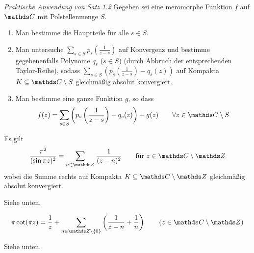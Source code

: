\noindent\emph{Praktische Anwendung von Satz 1.2} Gegeben sei eine meromorphe Funktion $f$ auf $\CC$ mit Polstellenmenge $S$.
\begin{enumerate}
\item Man bestimme die Hauptteile für alle $s\in S$.
\item Man untersuche $\sum _{s\in S} p_s(\frac{1}{z-s})$ auf Konvergenz und bestimme gegebenenfalls Polynome $q_s$ ($s\in S$) (durch Abbruch der entsprechenden Taylor-Reihe), sodass $\sum _{s\in S} (p_s(\frac{1}{z-s})-q_s(z))$ auf Kompakta $K \subseteq \CC\setminus S$ gleichmäßig absolut konvergiert.
\item Man bestimme eine ganze Funktion $g$, so dass
\[
	f(z) = \sum_{s\in S} \left(p_s\left(\frac{1}{z-s}\right)-q_s(z)\right) + g(z) \qquad \forall z\in \CC\setminus S
\]
\end{enumerate}

\begin{bsp-list}\label{bsp:partialbruch_cot}
\item Es gilt
\begin{equation}\label{eqn:bsp1.3.i}
	\frac{\pi^2}{(\sin \pi z)^2} = \sum _ {n \in \ZZ} \frac{1}{(z-n)^2} \qquad \text{für } z\in \CC\setminus\ZZ
\end{equation}
wobei die Summe rechts auf Kompakta $K \subseteq \CC\setminus\ZZ$ gleichmäßig absolut konvergiert.
\begin{bewe}
Siehe unten.
\end{bewe}

\item {}
\begin{equation}\label{eqn:bsp1.3.ii}
	\pi\cot(\pi z)
	= \frac{1}{z} + \sum _{n \in \ZZ\setminus\{0\}} \left( \frac{1}{z-n} + \frac{1}{n}\right)
	\qquad (z \in \CC\setminus\ZZ)
\end{equation}

\begin{bewe}
Siehe unten.
\end{bewe}
\end{bsp-list}

